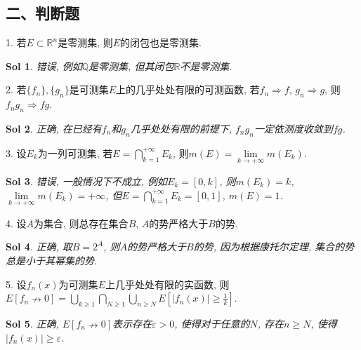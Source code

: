 \documentclass[UTF8]{article}
\newtheorem{solution}{Sol}
\begin{document}
  \subsection*{二、判断题}

  1. 若$E\subset \mathbb{R}^n$是零测集, 则$E$的闭包也是零测集.\par

  \begin{solution}
    错误, 例如$\mathbb{Q}$是零测集, 但其闭包$\mathbb{R}$不是零测集.\par
  \end{solution}

  2. 若$\{f_n\},\{g_n\}$是可测集$E$上的几乎处处有限的可测函数, 若$f_n\Rightarrow f$, $g_n \Rightarrow g$, 则$f_ng_n\Rightarrow fg$.\par
  
  \begin{solution}
    正确, 在已经有$f_n$和$g_n$几乎处处有限的前提下, $f_ng_n$一定依测度收敛到$fg$.\par
  \end{solution}

  3. 设$E_k$为一列可测集, 若$E=\bigcap_{k=1}^{+\infty}E_k$, 则$m(E)=\lim \limits_{k \to +\infty}m(E_k)$.\par

  \begin{solution}
    错误, 一般情况下不成立, 例如$E_k=[0,k]$, 则$m(E_k)=k$, $\lim \limits_{k \to +\infty}m(E_k)=+\infty$, 但$E=\bigcap_{k=1}^{+\infty}E_k=[0,1]$, $m(E)=1$.\par
  \end{solution}

  4. 设$A$为集合, 则总存在集合$B$, $A$的势严格大于$B$的势.\par

  \begin{solution}
    正确, 取$B=2^{A}$, 则$A$的势严格大于$B$的势, 因为根据康托尔定理, 集合的势总是小于其幂集的势.\par
  \end{solution}

  5. 设$f_n(x)$为可测集$E$上几乎处处有限的实函数, 则$E\left[f_n\nrightarrow 0\right]=\bigcup_{k\geqslant 1} \bigcap_{N\geqslant 1}\bigcup_{n\geqslant N} E\left[|f_n(x)|\geqslant \frac{1}{k}\right]$.\par

  \begin{solution}
    正确, $E\left[f_n\nrightarrow 0\right]$表示存在$\varepsilon >0$, 使得对于任意的$N$, 存在$n\geqslant N$, 使得$|f_n(x)|\geqslant \varepsilon$.\par
  \end{solution}
\end{document}
